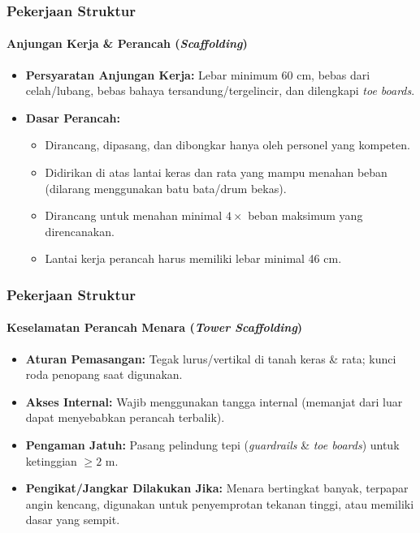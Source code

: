 \documentclass[../main.tex]{subfiles}
\begin{document}
\begin{frame}[mytitle=standard,t,mycolor=digiPH_gray,light]
	\frametitle{Pekerjaan Struktur}
	\framesubtitle{Anjungan Kerja \& Perancah (\textit{Scaffolding})}
	\begin{itemize}
		\item \textbf{Persyaratan Anjungan Kerja:} Lebar minimum 60 cm, bebas dari celah/lubang, bebas bahaya tersandung/tergelincir, dan dilengkapi \textit{toe boards}.
		\item \textbf{Dasar Perancah:}
		      \begin{itemize}
			      \item Dirancang, dipasang, dan dibongkar hanya oleh personel yang kompeten.
			      \item Didirikan di atas lantai keras dan rata yang mampu menahan beban (dilarang menggunakan batu bata/drum bekas).
			      \item Dirancang untuk menahan minimal $4\times$ beban maksimum yang direncanakan.
			      \item Lantai kerja perancah harus memiliki lebar minimal 46 cm.
		      \end{itemize}
	\end{itemize}
\end{frame}

\begin{frame}[mytitle=imageplus,t,mycolor=white,light]
	\frametitle{Pekerjaan Struktur}
	\framesubtitle{Keselamatan Perancah Menara (\textit{Tower Scaffolding})}
	\begin{itemize}
		\item \textbf{Aturan Pemasangan:} Tegak lurus/vertikal di tanah keras \& rata; kunci roda penopang saat digunakan.
		\item \textbf{Akses Internal:} Wajib menggunakan tangga internal (memanjat dari luar dapat menyebabkan perancah terbalik).
		\item \textbf{Pengaman Jatuh:} Pasang pelindung tepi (\textit{guardrails} \& \textit{toe boards}) untuk ketinggian $\ge 2\text{ m}$.
		\item \textbf{Pengikat/Jangkar Dilakukan Jika:} Menara bertingkat banyak, terpapar angin kencang, digunakan untuk penyemprotan tekanan tinggi, atau memiliki dasar yang sempit.
	\end{itemize}
\end{frame}
\end{document}

